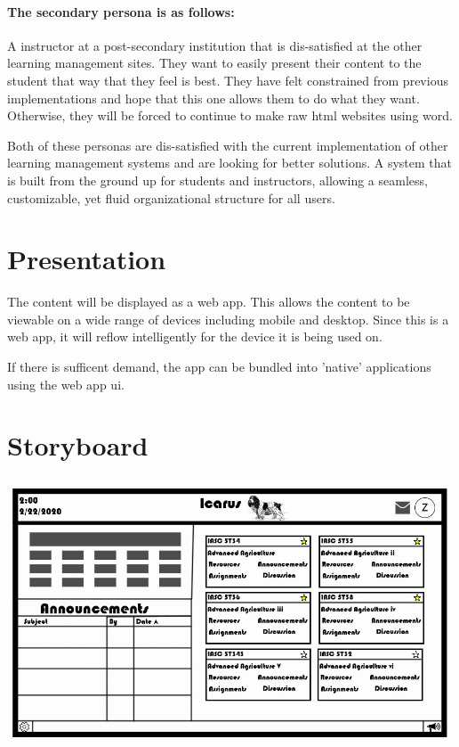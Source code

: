 \documentclass[12pt]{article}
\begin{document}
    \paragraph{The secondary persona is as follows:} A instructor at a post-secondary institution that is dis-satisfied at the other learning management sites.
    They want to easily present their content to the student that way that they feel is best.
    They have felt constrained from previous implementations and hope that this one allows them to do what they want.
    Otherwise, they will be forced to continue to make raw html websites using word.

    Both of these personas are dis-satisfied with the current implementation of other learning management systems and are looking for better solutions.
    A system that is built from the ground up for students and instructors, allowing a seamless, customizable, yet fluid organizational structure for all users.

    \section{Presentation}\label{sec:presentation}

    The content will be displayed as a web app.
    This allows the content to be viewable on a wide range of devices including mobile and desktop.
    Since this is a web app, it will reflow intelligently for the device it is being used on.

    If there is sufficent demand, the app can be bundled into 'native' applications using the web app ui.

    \section{Storyboard}\label{sec:storyboard}

    \includegraphics[width=\textwidth]{StoryBoard.jpg}
\end{document}
